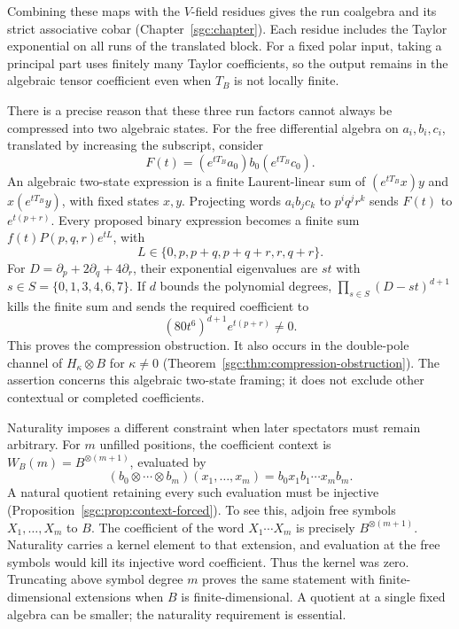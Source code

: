 Combining these maps with the \(V\)-field residues gives
the run coalgebra and its strict associative cobar
(Chapter~\ref{sgc:chapter}). Each residue includes the
Taylor exponential on all runs of the translated block.
For a fixed polar input, taking a principal part uses
finitely many Taylor coefficients, so the output remains
in the algebraic tensor coefficient even when \(T_B\)
is not locally finite.

There is a precise reason that these three run factors
cannot always be compressed into two algebraic states.
For the free differential algebra on
\(a_i,b_i,c_i\), translated by increasing the subscript,
consider
\[
 F(t)=(e^{tT_B}a_0)b_0(e^{tT_B}c_0).
\]
An algebraic two-state expression is a finite Laurent-linear
sum of \((e^{tT_B}x)y\) and \(x(e^{tT_B}y)\), with fixed
states \(x,y\). Projecting words \(a_ib_jc_k\) to
\(p^iq^jr^k\) sends \(F(t)\) to \(e^{t(p+r)}\).
Every proposed binary expression becomes a finite sum
\(f(t)P(p,q,r)e^{tL}\), with
\[
 L\in\{0,p,p+q,p+q+r,r,q+r\}.
\]
For \(D=\partial_p+2\partial_q+4\partial_r\), their
exponential eigenvalues are \(st\) with
\(s\in S=\{0,1,3,4,6,7\}\). If \(d\) bounds the
polynomial degrees, \(\prod_{s\in S}(D-st)^{d+1}\)
kills the finite sum and sends the required coefficient to
\[
 (80t^6)^{d+1}e^{t(p+r)}\ne0.
\]
This proves the compression obstruction. It also occurs
in the double-pole channel of \(H_\kappa\otimes B\)
for \(\kappa\ne0\)
(Theorem~\ref{sgc:thm:compression-obstruction}). The
assertion concerns this algebraic two-state framing; it
does not exclude other contextual or completed coefficients.

Naturality imposes a different constraint when later
spectators must remain arbitrary. For \(m\) unfilled
positions, the coefficient context is
\(W_B(m)=B^{\otimes(m+1)}\), evaluated by
\[
 (b_0\otimes\cdots\otimes b_m)(x_1,\ldots,x_m)
                  =b_0x_1b_1\cdots x_mb_m.
\]
A natural quotient retaining every such evaluation must
be injective (Proposition~\ref{sgc:prop:context-forced}).
To see this, adjoin free symbols \(X_1,\ldots,X_m\) to
\(B\). The coefficient of the word
\(X_1\cdots X_m\) is precisely \(B^{\otimes(m+1)}\).
Naturality carries a kernel element to that extension,
and evaluation at the free symbols would kill its injective
word coefficient. Thus the kernel was zero. Truncating
above symbol degree \(m\) proves the same statement with
finite-dimensional extensions when \(B\) is finite-dimensional.
A quotient at a single fixed algebra can be smaller;
the naturality requirement is essential.

